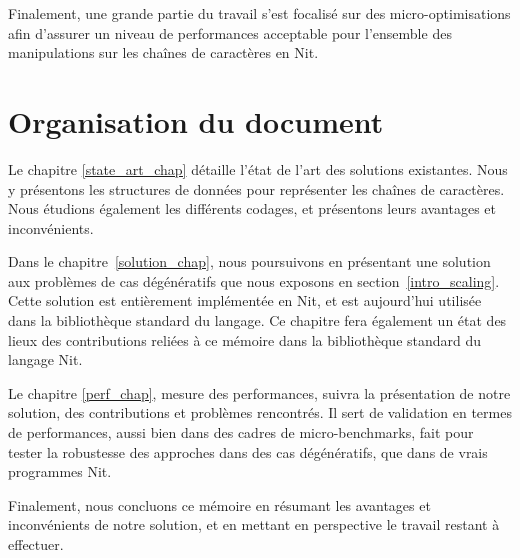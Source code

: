 \begin{introduction}
Finalement, une grande partie du travail s'est focalisé sur des micro-optimisations
afin d'assurer un niveau de performances acceptable pour l'ensemble des manipulations
sur les chaînes de caractères en Nit.

\section{Organisation du document}

Le chapitre \ref{state_art_chap} détaille l'état de l'art des solutions existantes.
Nous y présentons les structures de données pour représenter les chaînes de caractères.
Nous étudions également les différents codages, et présentons leurs avantages et inconvénients.

Dans le chapitre~\ref{solution_chap}, nous poursuivons en présentant une solution aux problèmes de
cas dégénératifs que nous exposons en section~\ref{intro_scaling}.
Cette solution est entièrement implémentée en Nit, et est aujourd'hui utilisée
dans la bibliothèque standard du langage.
Ce chapitre fera également un état des lieux des contributions reliées à ce mémoire dans
la bibliothèque standard du langage Nit.

Le chapitre \ref{perf_chap}, mesure des performances, suivra la présentation de notre solution, des
contributions et problèmes rencontrés.
Il sert de validation en termes de performances, aussi bien dans des cadres de
micro-benchmarks, fait pour tester la robustesse des approches dans des cas dégénératifs,
que dans de vrais programmes Nit.

Finalement, nous concluons ce mémoire en résumant les avantages et inconvénients
de notre solution, et en mettant en perspective le travail restant à effectuer.

\end{introduction}
